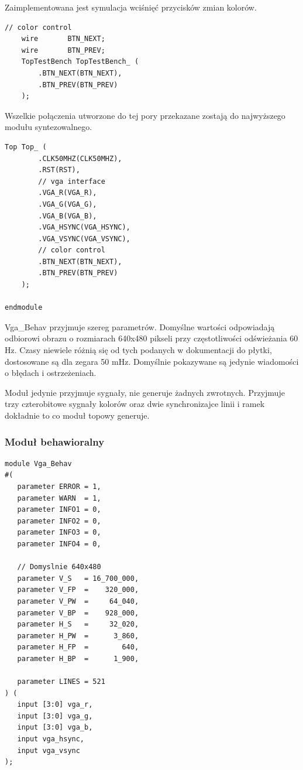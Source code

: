 \documentclass[a4paper,12pt]{article}
\begin{document}
Zaimplementowana jest symulacja wciśnięć przycisków zmian kolorów.
\begin{lstlisting}[label=Syncvga,caption=Sync.v,firstnumber=30]
    // color control
    wire       BTN_NEXT;
    wire       BTN_PREV;
    TopTestBench TopTestBench_ (
        .BTN_NEXT(BTN_NEXT),
        .BTN_PREV(BTN_PREV)
    );
\end{lstlisting}

Wszelkie połączenia utworzone do tej pory przekazane zostają do najwyższego modułu syntezowalnego.
\begin{lstlisting}[label=Syncvga,caption=Sync.v,firstnumber=38]
    Top Top_ (
        .CLK50MHZ(CLK50MHZ),
        .RST(RST),
        // vga interface
        .VGA_R(VGA_R),
        .VGA_G(VGA_G),
        .VGA_B(VGA_B),
        .VGA_HSYNC(VGA_HSYNC),
        .VGA_VSYNC(VGA_VSYNC),
        // color control
        .BTN_NEXT(BTN_NEXT),
        .BTN_PREV(BTN_PREV)
    );

endmodule
\end{lstlisting}

Vga\_Behav przyjmuje szereg parametrów. Domyślne wartości odpowiadają odbiorowi obrazu o rozmiarach 640x480 pikseli przy częstotliwości odświeżania 60 Hz. Czasy niewiele różnią się od tych podanych w dokumentacji do płytki, dostosowane są dla zegara 50 mHz. Domyślnie pokazywane są jedynie wiadomości o błędach i ostrzeżeniach.

Moduł jedynie przyjmuje sygnały, nie generuje żadnych zwrotnych. Przyjmuje trzy czterobitowe sygnały kolorów oraz dwie synchronizajce linii i ramek dokładnie to co moduł topowy generuje.
\subsubsection{Moduł behawioralny}
\begin{lstlisting}[label=Syncvga,caption=Sync.v]
module Vga_Behav
#(
   parameter ERROR = 1,
   parameter WARN  = 1,
   parameter INFO1 = 0,
   parameter INFO2 = 0,
   parameter INFO3 = 0,
   parameter INFO4 = 0,

   // Domyslnie 640x480
   parameter V_S   = 16_700_000,
   parameter V_FP  =    320_000,
   parameter V_PW  =     64_040,
   parameter V_BP  =    928_000,
   parameter H_S   =     32_020,
   parameter H_PW  =      3_860,
   parameter H_FP  =        640,
   parameter H_BP  =      1_900,

   parameter LINES = 521
) (
   input [3:0] vga_r,
   input [3:0] vga_g,
   input [3:0] vga_b,
   input vga_hsync,
   input vga_vsync
);
\end{lstlisting}
\end{document}
